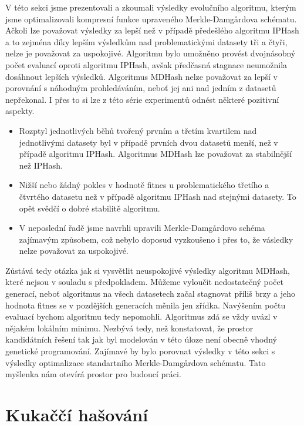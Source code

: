 V této sekci jsme prezentovali a zkoumali výsledky evolučního algoritmu, kterým jsme optimalizovali kompresní funkce
upraveného Merkle-Damg\r{a}rdova schématu. Ačkoli lze považovat výsledky za lepší než v případě předešlého algoritmu IPHash a to
zejména díky lepším výsledkům nad problematickými datasety tři a čtyři, nelze je považovat za uspokojivé. Algoritmu bylo
umožněno provést dvojnásobný počet evaluací oproti algoritmu IPHash, avšak předčasná stagnace neumožnila dosáhnout lepších
výsledků. Algoritmus MDHash nelze považovat za lepší v porovnání s náhodným prohledáváním, neboť jej ani nad jedním z datasetů
nepřekonal. I přes to si lze z této série experimentů odnést některé pozitivní aspekty.

\begin{itemize}
	\item Rozptyl jednotlivých běhů tvořený prvním a třetím kvartilem nad jednotlivými datasety byl v případě prvních dvou datasetů menší, než
		v případě algoritmu IPHash. Algoritmus MDHash lze považovat za stabilnější než IPHash.
	
	\item Nižší nebo žádný pokles v hodnotě fitnes u problematického třetího a čtvrtého datasetu než v případě algoritmu IPHash nad stejnými
		datasety. To opět svědčí o dobré stabilitě algoritmu.
		
	\item V neposlední řadě jsme navrhli upravili Merkle-Damg\r{a}rdovo schéma zajímavým způsobem, což nebylo doposud vyzkoušeno i přes to,
		že vásledky nelze považovat za uspokojivé.
\end{itemize}

Zůstává tedy otázka jak si vysvětlit neuspokojivé výsledky algoritmu MDHash, které nejsou v souladu s předpokladem. Můžeme vyloučit
nedostatečný počet generací, neboť algoritmus na všech datasetech začal stagnovat příliš brzy a jeho hodnota fitnes se v pozdějších
generacích měnila jen zřídka. Navýšením počtu evaluací bychom algoritmu tedy nepomohli. Algoritmus zdá se vždy uvázl v nějakém lokálním
minimu. Nezbývá tedy, než konstatovat, že prostor kandidátních řešení tak jak byl modelován v této úloze není obecně vhodný genetické
programování. Zajímavé by bylo porovnat výsledky v této sekci s výsledky optimalizace standartního Merkle-Damg\r{a}rdova schématu. Tato
myšlenka nám otevírá prostor pro budoucí práci.

\section{Kukaččí hašování}

